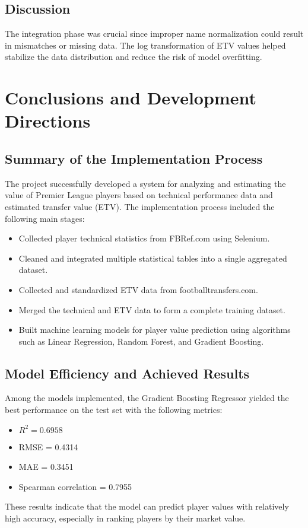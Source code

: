 \documentclass[12pt,a4paper]{article}
\begin{document}
\subsection{Discussion}
The integration phase was crucial since improper name normalization could result in mismatches or missing data. The log transformation of ETV values helped stabilize the data distribution and reduce the risk of model overfitting.

\section{Conclusions and Development Directions}

\subsection{Summary of the Implementation Process}
The project successfully developed a system for analyzing and estimating the value of Premier League players based on technical performance data and estimated transfer value (ETV). The implementation process included the following main stages:
\begin{itemize}
    \item Collected player technical statistics from FBRef.com using Selenium.
    \item Cleaned and integrated multiple statistical tables into a single aggregated dataset.
    \item Collected and standardized ETV data from footballtransfers.com.
    \item Merged the technical and ETV data to form a complete training dataset.
    \item Built machine learning models for player value prediction using algorithms such as Linear Regression, Random Forest, and Gradient Boosting.
\end{itemize}

\subsection{Model Efficiency and Achieved Results}
Among the models implemented, the Gradient Boosting Regressor yielded the best performance on the test set with the following metrics:
\begin{itemize}
    \item $R^2 = 0.6958$
    \item RMSE = 0.4314
    \item MAE = 0.3451
    \item Spearman correlation = 0.7955
\end{itemize}
These results indicate that the model can predict player values with relatively high accuracy, especially in ranking players by their market value.
\end{document}
